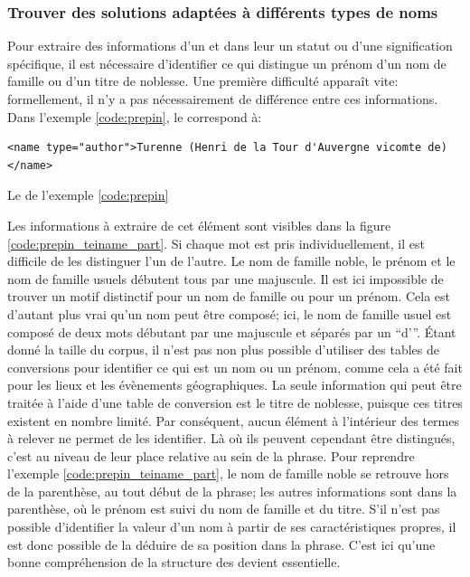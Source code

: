 \subsubsection{Trouver des solutions adaptées à différents types de noms}
Pour extraire des informations d'un \tname{} et dans leur un statut ou d'une signification spécifique, il est nécessaire d'identifier ce qui distingue un prénom d'un nom de famille ou d'un titre de noblesse. Une première difficulté apparaît vite: formellement, il n'y a pas nécessairement de différence entre ces informations. Dans l'exemple \ref{code:prepin}, le \tname{} correspond à:

\begin{listing}[h!]
	\centering
	\begin{verbatim}
<name type="author">Turenne (Henri de la Tour d'Auvergne vicomte de)</name>
	\end{verbatim}
	\caption{Le \tname{} de l'exemple \ref{code:prepin}}
	\label{code:prepin_teiname}
\end{listing}

Les informations à extraire de cet élément sont visibles dans la figure \ref{code:prepin_teiname_part}. Si chaque mot est pris individuellement, il est difficile de les distinguer l'un de l'autre. Le nom de famille noble, le prénom et le nom de famille usuels débutent tous par une majuscule. Il est ici impossible de trouver un motif distinctif pour un nom de famille ou pour un prénom. Cela est d'autant plus vrai qu'un nom peut être composé; ici, le nom de famille usuel est composé de deux mots débutant par une majuscule et séparés par un \enquote{d'}. Étant donné la taille du corpus, il n'est pas non plus possible d'utiliser des tables de conversions pour identifier ce qui est un nom ou un prénom, comme cela a été fait pour les lieux et les évènements géographiques. La seule information qui peut être traitée à l'aide d'une table de conversion est le titre de noblesse, puisque ces titres existent en nombre limité. Par conséquent, aucun élément à l'intérieur des termes à relever ne permet de les identifier. Là où ils peuvent cependant être distingués, c'est au niveau de leur place relative au sein de la phrase. Pour reprendre l'exemple \ref{code:prepin_teiname_part}, le nom de famille noble se retrouve hors de la parenthèse, au tout début de la phrase; les autres informations sont dans la parenthèse, où le prénom est suivi du nom de famille et du titre. S'il n'est pas possible d'identifier la valeur d'un nom à partir de ses caractéristiques propres, il est donc possible de la déduire de sa position dans la phrase. C'est ici qu'une bonne compréhension de la structure des \tname{} devient essentielle.

